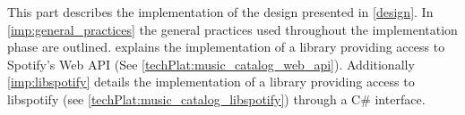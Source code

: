 This part describes the implementation of the design presented in \cref{design}. In \cref{imp:general_practices} the general practices used throughout the implementation phase are outlined.  explains the implementation of a library providing access to Spotify's Web API (See \cref{techPlat:music_catalog_web_api}). Additionally \cref{imp:libspotify} details the implementation of a library providing access to libspotify (see \cref{techPlat:music_catalog_libspotify}) through a C\# interface.
